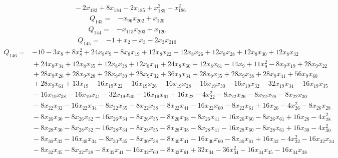 \documentclass[11pt]{article}
\theoremstyle{definition}\newtheorem{definition}[theorem]{Definition}
\begin{document}
{\begin{align*}
 &{}-2x_{183} +8x_{184} -2x_{185} +x_{185}^{2} -x_{186}^{2}
\end{align*}
\begin{align*}
 Q_{143}={}&-x_{96}x_{202} +x_{120}
\end{align*}
\begin{align*}
 Q_{144}={}&-x_{113}x_{203} +x_{120}
\end{align*}
\begin{align*}
 Q_{145}={}&-1 +x_{2} -x_{3} -2x_{3}x_{210}
\end{align*}
\begin{align*}
 Q_{146}={}&-10 -3x_{8} +8x_{8}^{2} +24x_{8}x_{9} -8x_{8}x_{19} +12x_{8}x_{22} +12x_{8}x_{26} +12x_{8}x_{28} +12x_{8}x_{30} +12x_{8}x_{32}\\
 &{}+24x_{8}x_{34} +12x_{8}x_{35} +12x_{8}x_{38} +12x_{8}x_{41} +24x_{8}x_{60} +12x_{8}x_{61} -14x_{9} +11x_{9}^{2} -8x_{9}x_{19} +28x_{9}x_{22}\\
 &{}+28x_{9}x_{26} +28x_{9}x_{28} +28x_{9}x_{30} +28x_{9}x_{32} +36x_{9}x_{34} +28x_{9}x_{35} +28x_{9}x_{38} +28x_{9}x_{41} +56x_{9}x_{60}\\
 &{}+28x_{9}x_{61} +13x_{19} -16x_{19}x_{22} -16x_{19}x_{26} -16x_{19}x_{28} -16x_{19}x_{30} -16x_{19}x_{32} -32x_{19}x_{34} -16x_{19}x_{35}\\
 &{}-16x_{19}x_{38} -16x_{19}x_{41} -32x_{19}x_{60} -16x_{19}x_{61} +16x_{22} -4x_{22}^{2} -8x_{22}x_{26} -8x_{22}x_{28} -8x_{22}x_{30}\\
 &{}-8x_{22}x_{32} -16x_{22}x_{34} -8x_{22}x_{35} -8x_{22}x_{38} -8x_{22}x_{41} -16x_{22}x_{60} -8x_{22}x_{61} +16x_{26} -4x_{26}^{2} -8x_{26}x_{28}\\
 &{}-8x_{26}x_{30} -8x_{26}x_{32} -16x_{26}x_{34} -8x_{26}x_{35} -8x_{26}x_{38} -8x_{26}x_{41} -16x_{26}x_{60} -8x_{26}x_{61} +16x_{28} -4x_{28}^{2}\\
 &{}-8x_{28}x_{30} -8x_{28}x_{32} -16x_{28}x_{34} -8x_{28}x_{35} -8x_{28}x_{38} -8x_{28}x_{41} -16x_{28}x_{60} -8x_{28}x_{61} +16x_{30} -4x_{30}^{2}\\
 &{}-8x_{30}x_{32} -16x_{30}x_{34} -8x_{30}x_{35} -8x_{30}x_{38} -8x_{30}x_{41} -16x_{30}x_{60} -8x_{30}x_{61} +16x_{32} -4x_{32}^{2} -16x_{32}x_{34}\\
 &{}-8x_{32}x_{35} -8x_{32}x_{38} -8x_{32}x_{41} -16x_{32}x_{60} -8x_{32}x_{61} +32x_{34} -36x_{34}^{2} -16x_{34}x_{35} -16x_{34}x_{38}\\

\end{align*}}
\end{document}
